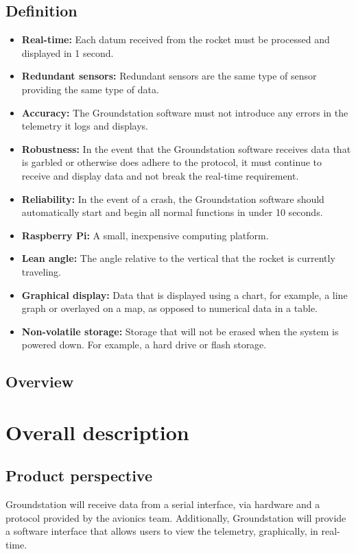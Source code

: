 \documentclass[10pt,journal,draftclsnofoot,onecolumn]{IEEEtran}
\begin{document}
	\subsection{Definition}
	
	\begin{itemize}
		\item \textbf{Real-time:} Each datum received from the rocket must be processed and displayed in 1 second.
		\item \textbf{Redundant sensors:} Redundant sensors are the same type of sensor providing the same type of data.
		\item \textbf{Accuracy:} The Groundstation software must not introduce any errors in the telemetry it logs and displays.
		\item \textbf{Robustness:} In the event that the Groundstation software receives data that is garbled or otherwise does adhere to the protocol, it must continue to receive and display data and not break the real-time requirement.
		\item \textbf{Reliability:} In the event of a crash, the Groundstation software should automatically start and begin all normal functions in under 10 seconds.
		\item \textbf{Raspberry Pi:} A small, inexpensive computing platform.
		\item \textbf{Lean angle:} The angle relative to the vertical that the rocket is currently traveling.
		\item \textbf{Graphical display:} Data that is displayed using a chart, for example, a line graph or overlayed on a map, as opposed to numerical data in a table.
		\item \textbf{Non-volatile storage:} Storage that will not be erased when the system is powered down. For example, a hard drive or flash storage.
	\end{itemize}	
	
	\subsection{Overview}
		
	
	\section{Overall description}
	\subsection{Product perspective}
	Groundstation will receive data from a serial interface, via hardware and a protocol provided by the avionics team.
	Additionally, Groundstation will provide a software interface that allows users to view the telemetry, graphically, in real-time.
\end{document}
